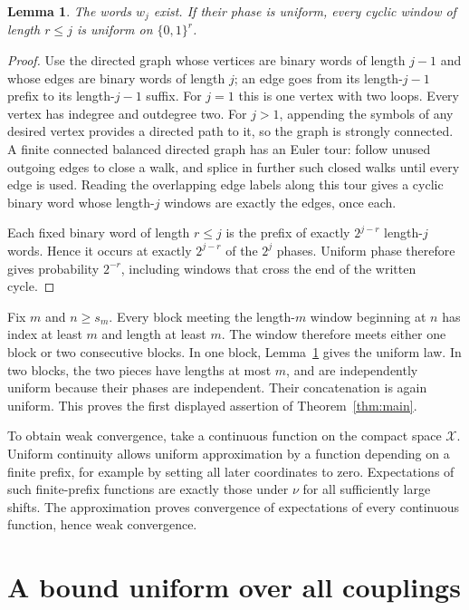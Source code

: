 \documentclass[11pt]{article}
\newtheorem{lemma}{Lemma}
\begin{document}
\begin{lemma}\label{lem:cycles}
The words \(w_j\) exist. If their phase is uniform, every cyclic window of length \(r\leq j\) is uniform on \(\{0,1\}^r\).
\end{lemma}
\begin{proof}
Use the directed graph whose vertices are binary words of length \(j-1\) and whose edges are binary words of length \(j\); an edge goes from its length-\(j-1\) prefix to its length-\(j-1\) suffix. For \(j=1\) this is one vertex with two loops. Every vertex has indegree and outdegree two. For \(j>1\), appending the symbols of any desired vertex provides a directed path to it, so the graph is strongly connected. A finite connected balanced directed graph has an Euler tour: follow unused outgoing edges to close a walk, and splice in further such closed walks until every edge is used. Reading the overlapping edge labels along this tour gives a cyclic binary word whose length-\(j\) windows are exactly the edges, once each.

Each fixed binary word of length \(r\leq j\) is the prefix of exactly \(2^{j-r}\) length-\(j\) words. Hence it occurs at exactly \(2^{j-r}\) of the \(2^j\) phases. Uniform phase therefore gives probability \(2^{-r}\), including windows that cross the end of the written cycle.
\end{proof}

Fix \(m\) and \(n\geq s_m\). Every block meeting the length-\(m\) window beginning at \(n\) has index at least \(m\) and length at least \(m\). The window therefore meets either one block or two consecutive blocks. In one block, Lemma~\ref{lem:cycles} gives the uniform law. In two blocks, the two pieces have lengths at most \(m\), and are independently uniform because their phases are independent. Their concatenation is again uniform. This proves the first displayed assertion of Theorem~\ref{thm:main}.

To obtain weak convergence, take a continuous function on the compact space \(\mathcal X\). Uniform continuity allows uniform approximation by a function depending on a finite prefix, for example by setting all later coordinates to zero. Expectations of such finite-prefix functions are exactly those under \(\nu\) for all sufficiently large shifts. The approximation proves convergence of expectations of every continuous function, hence weak convergence.

\section{A bound uniform over all couplings}
\end{document}
